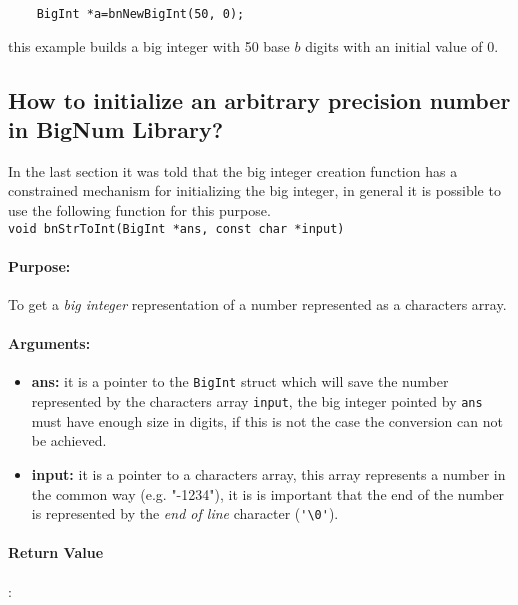 \documentclass{book}
\begin{document}
\begin{verbatim}
    BigInt *a=bnNewBigInt(50, 0);
\end{verbatim}

this example builds a big integer with 50 base $b$ digits with an initial value of 0.

\subsection{How to initialize an arbitrary precision number in BigNum Library?}

In the last section it was told that the big integer creation function has a constrained mechanism for initializing the big integer, in general it is possible to use the following function for this purpose.\\

\verb+void bnStrToInt(BigInt *ans, const char *input)+\\

\paragraph{Purpose:} 

To get a \emph{big integer} representation of a number represented as a characters array.

\paragraph{Arguments:}

\begin{itemize}
\item {\bf ans:} it is a pointer to the \verb+BigInt+ struct which will save the number represented by the characters array \verb+input+, the big integer pointed by \verb+ans+ must have enough size in digits, if this is not the case the conversion can not be achieved.

\item {\bf input:} it is a pointer to a characters array, this array represents a number in the common way (e.g. "-1234"), it is is important that the end of the number is represented by the \emph{end of line} character (\verb+'\0'+).  

\end{itemize}

\paragraph{Return Value}:\\
\end{document}
